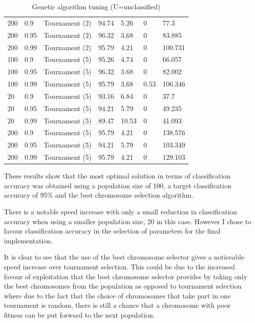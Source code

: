 \documentclass[a4paper]{article}
\begin{document}
\begin{table}[h!]
\begin{tabular}{@{}lllllll@{}}
    200             & 0.9         & Tournament (2) & 94.74         & 5.26       & 0      & 77.3     \\
    200             & 0.95        & Tournament (2) & 96.32         & 3.68       & 0      & 83.885   \\
    200             & 0.99        & Tournament (2) & 95.79         & 4.21       & 0      & 100.731  \\
    100             & 0.9         & Tournament (5) & 95.26         & 4.74       & 0      & 66.057   \\
    100             & 0.95        & Tournament (5) & 96.32         & 3.68       & 0      & 82.002   \\
    100             & 0.99        & Tournament (5) & 95.79         & 3.68       & 0.53   & 106.346  \\
    20              & 0.9         & Tournament (5) & 93.16         & 6.84       & 0      & 37.7     \\
    20              & 0.95        & Tournament (5) & 94.21         & 5.79       & 0      & 49.235   \\
    20              & 0.99        & Tournament (5) & 89.47         & 10.53      & 0      & 41.093   \\
    200             & 0.9         & Tournament (5) & 95.79         & 4.21       & 0      & 138.576  \\
    200             & 0.95        & Tournament (5) & 94.21         & 5.79       & 0      & 103.349  \\
    200             & 0.99        & Tournament (5) & 95.79         & 4.21       & 0      & 129.103  \\
    \bottomrule
  \end{tabular}
  \caption{Genetic algorithm tuning (U=unclassified)}
  \label{tab:ga_tuning}
\end{table}

These results show that the most optimal solution in terms of classification
accuracy was obtained using a population size of 100, a target classification
accuracy of 95\% and the best chromosome selection algorithm.

There is a notable speed increase with only a small reduction in classification
accuracy when using a smaller population size, 20 in this case. However I chose
to favour classification accuracy in the selection of parameters for the final
implementation.

It is clear to see that the use of the best chromosome selector gives a
noticeable speed increase over tournament selection. This could be due to the
increased favour of exploitation that the best chromosome selector provides by
taking only the best chromosomes from the population as opposed to tournament
selection where due to the fact that the choice of chromosomes that take part in
one tournament is random, there is still a chance that a chromosome with poor
fitness can be put forward to the next population.
\end{document}
